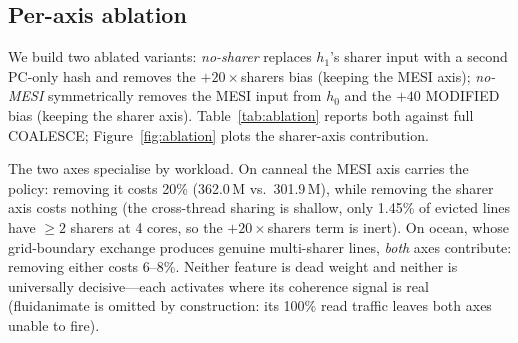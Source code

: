 \documentclass[conference]{IEEEtran}
\begin{document}
\subsection{Per-axis ablation}

We build two ablated variants: \emph{no-sharer} replaces $h_1$'s sharer input with a second PC-only hash and removes the $+20\times$sharers bias (keeping the MESI axis); \emph{no-MESI} symmetrically removes the MESI input from $h_0$ and the $+40$ MODIFIED bias (keeping the sharer axis). Table~\ref{tab:ablation} reports both against full COALESCE; Figure~\ref{fig:ablation} plots the sharer-axis contribution.

The two axes specialise by workload. On canneal the MESI axis carries the policy: removing it costs 20\% (362.0\,M vs.\ 301.9\,M), while removing the sharer axis costs nothing (the cross-thread sharing is shallow, only 1.45\% of evicted lines have $\geq 2$ sharers at 4 cores, so the $+20\times$sharers term is inert). On ocean, whose grid-boundary exchange produces genuine multi-sharer lines, \emph{both} axes contribute: removing either costs 6--8\%. Neither feature is dead weight and neither is universally decisive---each activates where its coherence signal is real (fluidanimate is omitted by construction: its 100\% read traffic leaves both axes unable to fire).

\begin{table}[tbp]
    \centering
    \renewcommand{\arraystretch}{1.15}
    \caption{Per-axis ablation: total cycles for full COALESCE and the two single-axis variants (parenthesised: \% slower than full)}
    \label{tab:ablation}
\end{table}
\end{document}
